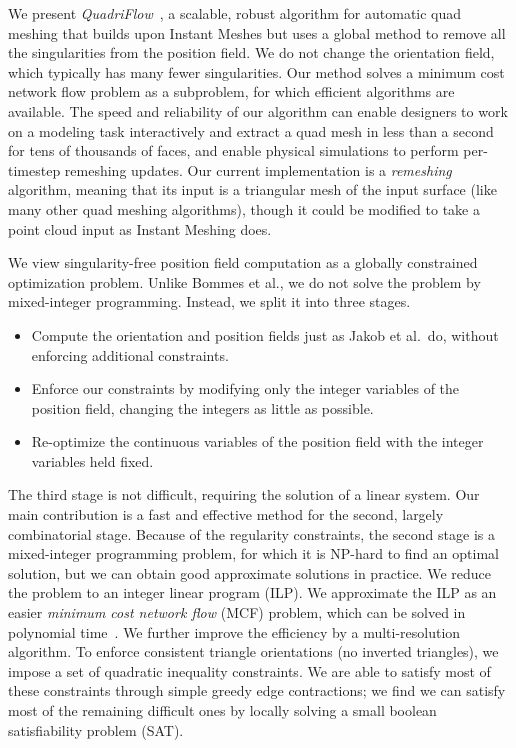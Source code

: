 We present \emph{QuadriFlow}~\cite{huang2018quadriflow}, a scalable, robust algorithm for automatic quad meshing that builds upon Instant Meshes but uses a global method to remove all the singularities from the position field.
We do not change the orientation field, which typically has many fewer singularities. Our method solves a minimum cost network flow problem as a subproblem, for which efficient algorithms are available. The speed and reliability of our algorithm can enable designers to work on a modeling task interactively and extract a quad mesh in less than a second for tens of thousands of faces, and enable physical simulations to perform per-timestep remeshing updates. Our current implementation is a \emph{remeshing} algorithm, meaning that its input is a triangular mesh of the input surface (like many other quad meshing algorithms), though it could be modified to take a point cloud input as Instant Meshing does.

We view singularity-free position field computation as a globally constrained optimization problem.
Unlike Bommes et al., we do not solve the problem by mixed-integer programming. Instead, we split it into three stages.
\begin{itemize}
\item Compute the orientation and position fields just as Jakob et al.\ do, without enforcing additional constraints.
\item Enforce our constraints by modifying only the integer variables of the position field, changing the integers as little as possible.
\item Re-optimize the continuous variables of the position field with the integer variables held fixed.
\end{itemize}
The third stage is not difficult, requiring the solution of a linear system. Our main contribution is a fast and effective method for the second, largely combinatorial stage. Because of the regularity constraints, the second stage is a mixed-integer programming problem, for which it is NP-hard to find an optimal solution, but we can obtain good approximate solutions in practice. We reduce the problem to an integer linear program (ILP). We approximate the ILP as an easier \emph{minimum cost network flow} (MCF) problem, which can be solved in polynomial time~\cite{klein1967primal}. We further improve the efficiency by a multi-resolution algorithm. To enforce consistent triangle orientations (no inverted triangles), we impose a set of quadratic inequality constraints. We are able to satisfy most of these constraints through simple greedy edge contractions; we find we can satisfy most of the remaining difficult ones by locally solving a small boolean satisfiability problem (SAT).

